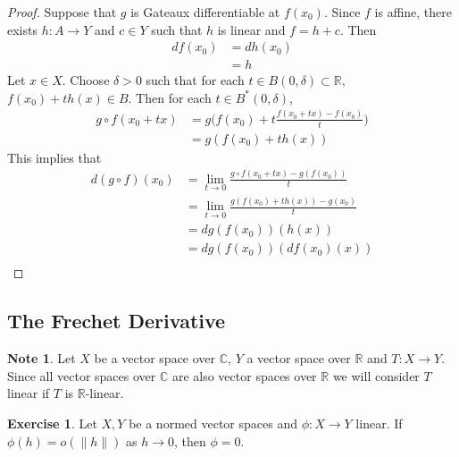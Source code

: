 \documentclass[12pt]{amsart}
\theoremstyle{definition}
\newtheorem{note}[definition]{Note}
\newtheorem{ex}[definition]{Exercise}
\newcommand{\del}{\delta}
\newcommand{\C}{\mathbb{C}}
\newcommand{\R}{\mathbb{R}}
\DeclareMathOperator*{\0}{\mbf{0}}
\DeclareMathOperator*{\1}{\mbf{1}}
\newcommand{\lex}[1]{\label{ex:#1}}
\begin{document}
	\begin{proof}
	Suppose that $g$ is Gateaux differentiable at $f(x_0)$. Since $f$ is affine, there exists $h:A \rightarrow Y$ and $c \in Y$ such that $h$ is linear and $f = h+c$. Then 
	\begin{align*}
	df(x_0) 
	&= dh(x_0) \\
	&= h
	\end{align*}
	Let $x \in X$. Choose $\del >0$ such that for each $t \in B(0, \del) \subset \R$, $f(x_0) + th(x) \in B$. Then for each $t \in B^*(0, \del)$,
	\begin{align*}
	g \circ f(x_0 + tx)
	&= g \bigg ( f(x_0) + t \frac{f(x_0 + tx) - f(x_0)}{t} \bigg) \\
	&=  g ( f(x_0) + th(x)) 
	\end{align*}
	This implies that
	\begin{align*}
	d(g \circ f)(x_0)
	&= \lim_{t \rightarrow 0 }\frac{g \circ f (x_0 + tx) - g(f(x_0))}{t} \\  
	&= \lim_{t \rightarrow 0} \frac{g ( f(x_0) + th(x)) - g(x_0)}{t} \\
	&= dg(f(x_0))(h(x)) \\
	&= dg(f(x_0))(df(x_0)(x)) \\
	\end{align*}
	\end{proof}
	
	
	
	
	
	
	
	
	
	
	
	
	
	
	
	\newpage
	\subsection{The Frechet Derivative}
	
	\begin{note}
		Let $X$ be a vector space over $\C$, $Y$ a vector space over $\R$ and $T:X \rightarrow Y$. Since all vector spaces over $\C$ are also vector spaces over $\R$ we will consider $T$ linear if $T$ is $\R$-linear. 
	\end{note}
	
	\begin{ex} \lex{62001}
	Let $X,Y$ be a normed vector spaces and $\phi: X \rightarrow Y$ linear. If $\phi(h) = o(\|h\|)$ as $h \rightarrow 0$, then $\phi = 0$. 
	\end{ex}
	
\end{document}
